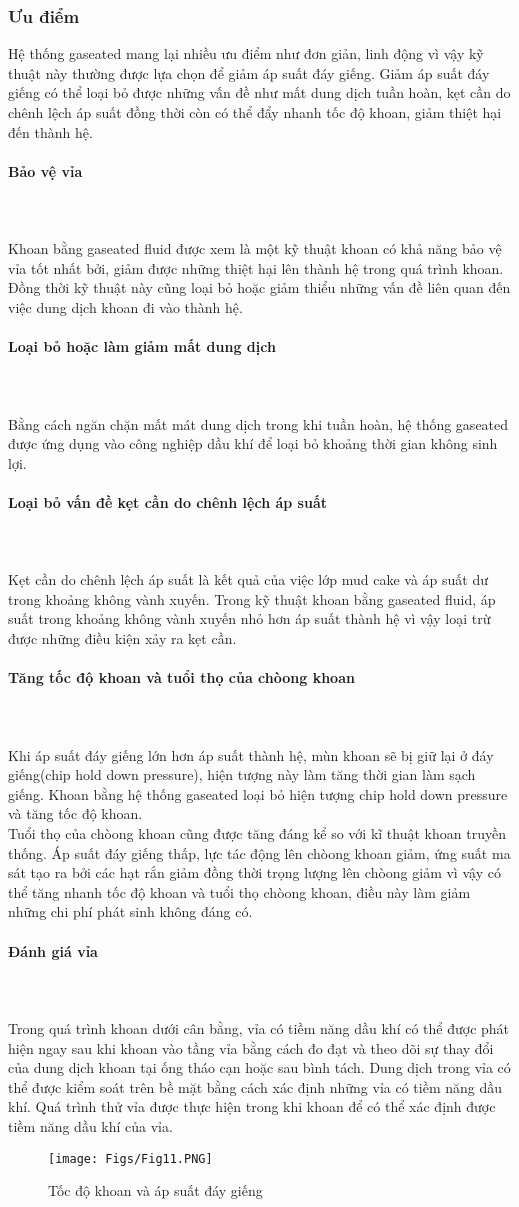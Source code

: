 \documentclass[12pt,a4paper]{article}
\newcommand{\subsubsubsection}[1]{\paragraph{#1}\mbox{}\\}
\begin{document}
\subsubsection{Ưu điểm}
Hệ thống gaseated mang lại nhiều ưu điểm như đơn giản, linh động vì vậy kỹ thuật này thường được lựa chọn để giảm áp suất đáy giếng. Giảm áp suất đáy giếng có thể loại bỏ được những vấn đề như mất dung dịch tuần hoàn, kẹt cần do chênh lệch áp suất đồng thời còn có thể đẩy nhanh tốc độ khoan, giảm thiệt hại đến thành hệ. \\
	\subsubsubsection{Bảo vệ vỉa}\\
	Khoan bằng gaseated fluid được xem là một kỹ thuật khoan có khả năng bảo vệ vỉa tốt nhất bởi, giảm được những thiệt hại lên thành hệ trong quá trình khoan. Đồng thời kỹ thuật này cũng loại bỏ hoặc giảm thiểu những vấn đề liên quan đến việc dung dịch khoan đi vào thành hệ. 
	\subsubsubsection{Loại bỏ hoặc làm giảm mất dung dịch}\\
	Bằng cách ngăn chặn mất mát dung dịch trong khi tuần hoàn, hệ thống gaseated được ứng dụng vào công nghiệp dầu khí để loại bỏ khoảng thời gian không sinh lợi.
	\subsubsubsection{Loại bỏ vấn đề kẹt cần do chênh lệch áp suất}\\
	Kẹt cần do chênh lệch áp suất là kết quả của việc lớp mud cake và áp suất dư trong khoảng không vành xuyến. Trong kỹ thuật khoan bằng gaseated fluid, áp suất trong khoảng không vành xuyến nhỏ hơn áp suất thành hệ vì vậy loại trừ được những điều kiện xảy ra kẹt cần.
	\subsubsubsection{Tăng tốc độ khoan và tuổi thọ của chòong khoan}\\
	Khi áp suất đáy giếng lớn hơn áp suất thành hệ, mùn khoan sẽ bị giữ lại ở đáy giếng(chip hold down pressure), hiện tượng này làm tăng thời gian làm sạch giếng. Khoan bằng hệ thống gaseated loại bỏ hiện tượng chip hold down pressure và tăng tốc độ khoan.\\
	Tuổi thọ của chòong khoan cũng được tăng đáng kể so với kĩ thuật khoan truyền thống. Áp suất đáy giếng thấp, lực tác động lên chòong khoan giảm, ứng suất ma sát tạo ra bởi các hạt rắn giảm đồng thời trọng lượng lên chòong giảm vì vậy có thể tăng nhanh tốc độ khoan và tuổi thọ chòong khoan, điều này làm giảm những chi phí phát sinh không đáng có. 
	\subsubsubsection{Đánh giá vỉa}\\
	Trong quá trình khoan dưới cân bằng, vỉa có tiềm năng dầu khí có thể được phát hiện ngay sau khi khoan vào tầng vỉa bằng cách đo đạt và theo dõi sự thay đổi của dung dịch khoan tại ống tháo cạn hoặc sau bình tách. Dung dịch trong vỉa có thể được kiểm soát trên bề mặt bằng cách xác định những vỉa có tiềm năng dầu khí. Quá trình thử vỉa được thực hiện trong khi khoan để có thể xác định được tiềm năng dầu khí của vỉa.
	\begin{figure}[h]
		\centering
		\texttt{[image: Figs/Fig11.PNG]}
		\caption{Tốc độ khoan và áp suất đáy giếng\cite{rehm2013underbalanced}}
	\end{figure}
\end{document}
